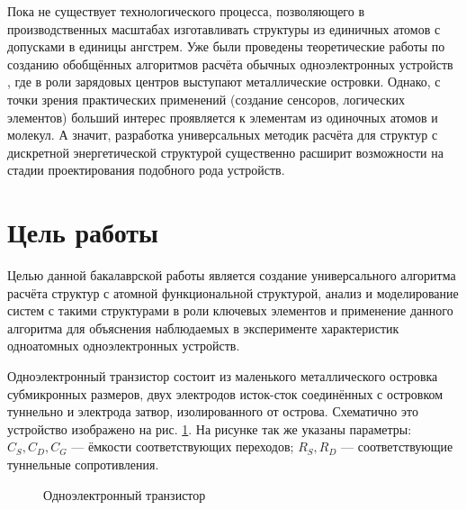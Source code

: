 \documentclass[12pt,a4paper]{report}
\begin{document}
Пока не существует технологического процесса, позволяющего в производственных масштабах изготавливать структуры из единичных атомов с допусками в единицы ангстрем. Уже были проведены теоретические работы по созданию обобщённых алгоритмов расчёта обычных одноэлектронных устройств \cite{Dobr}, где в роли зарядовых центров выступают металлические островки. Однако, с точки зрения практических применений (создание сенсоров, логических элементов) больший интерес проявляется к элементам из одиночных атомов и молекул. А значит, разработка универсальных методик расчёта для структур с дискретной энергетической структурой существенно расширит возможности на стадии проектирования подобного рода устройств.



\section*{Цель работы}

Целью данной бакалаврской работы является создание универсального алгоритма расчёта структур с атомной функциональной структурой, анализ и моделирование систем с такими структурами в роли ключевых элементов и применение данного алгоритма для объяснения наблюдаемых в эксперименте характеристик одноатомных одноэлектронных устройств.



Одноэлектронный транзистор состоит из маленького металлического островка субмикронных размеров, двух электродов исток-сток соединённых с островком туннельно и электрода затвор, изолированного от острова. Схематично это устройство изображено на рис. \ref{fig:SET}. На рисунке так же указаны параметры: $C_S, C_D, C_G$ — ёмкости соответствующих переходов; $R_S, R_D$ — соответствующие туннельные сопротивления.

\begin{figure}
	\caption{Одноэлектронный транзистор}
	\label{fig:SET}
\end{figure}
\end{document}
